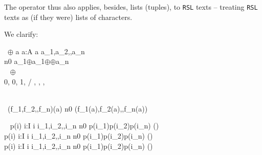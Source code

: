 \noindent
The {\CONCAT} operator thus also applies, besides, lists (tuples), to
\texttt{RSL} texts -- treating \texttt{RSL} texts as (if they were)
lists of characters.



We clarify:


\bp
\>\ $\oplus$ {\LBRACE} a {\BAR} a:A {\RDOT} a {\ISIN} {\LBRACE}a\_1,a\_2,{\DOTDOTDOT},a\_n{\RBRACE} {\RBRACE} {\EQ}\\
\>\>\> n{\GT}0  a\_1$\oplus$a\_1$\oplus${\DOTDOTDOT}$\oplus$a\_n \\
\>\>\>\>\  $\oplus$ \\
\>\>\>\>\>\>{\PLUS} {\RIGHTARROW} 0, {\MINUS} {\RIGHTARROW} 0, {\AST} {\RIGHTARROW} 1, / {\RIGHTARROW} , {\UNION} {\RIGHTARROW} {\LBRACE}{\RBRACE}, {\INTER} {\RIGHTARROW} {\LBRACE}{\RBRACE}, {\DOTDOTDOT}\\
\>\>\>\>\   
\ep

\bp
\>\ (f\_1,f\_2,{\DOTDOTDOT},f\_n)(a) {\IS}  n{\GT}0  (f\_1(a),f\_2(a),{\DOTDOTDOT},f\_n(a))   
\ep


\bp
\>\ {\PARL} {\LBRACE} p(i) {\BAR} i:I {\RDOT} i {\ISIN} {\LBRACE}i\_1,i\_2,{\DOTDOTDOT},i\_n{\RBRACE} {\RBRACE} {\IS}  n{\GT}0  p(i\_1){\PARL}p(i\_2){\PARL}{\DOTDOTDOT}{\PARL}p(i\_n)  () \\
\>{\NONDETCHOICE} {\LBRACE} p(i) {\BAR} i:I {\RDOT} i {\ISIN} {\LBRACE}i\_1,i\_2,{\DOTDOTDOT},i\_n{\RBRACE} {\RBRACE} {\IS}  n{\GT}0  p(i\_1){\NONDETCHOICE}p(i\_2){\NONDETCHOICE}{\DOTDOTDOT}{\NONDETCHOICE}p(i\_n)  () \\
\>{\DETCHOICE} {\LBRACE} p(i) {\BAR} i:I {\RDOT} i {\ISIN} {\LBRACE}i\_1,i\_2,{\DOTDOTDOT},i\_n{\RBRACE} {\RBRACE} {\IS}  n{\GT}0  p(i\_1){\DETCHOICE}p(i\_2){\DETCHOICE}{\DOTDOTDOT}{\DETCHOICE}p(i\_n)  () 
\ep


